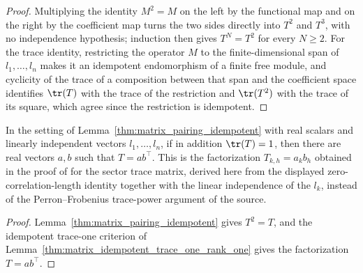 \begin{proof}
    \leanok
    Multiplying the identity $M^2=M$ on the left by the functional map and
    on the right by the coefficient map turns the two sides directly into
    $T^2$ and $T^3$, with no independence hypothesis; induction then gives
    $T^N=T^2$ for every $N\geq2$. For the trace identity, restricting the
    operator $M$ to the finite-dimensional span of $l_1,\ldots,l_n$ makes it
    an idempotent endomorphism of a finite free module, and cyclicity of
    the trace of a composition between that span and the coefficient space
    identifies $\tr(T)$ with the trace of the restriction and
    $\tr(T^2)$ with the trace of its square, which agree since
    the restriction is idempotent.
\end{proof}

\begin{lemma}
    \label{thm:matrix_pairing_rank_one}
    \leanok
    In the setting of Lemma~\ref{thm:matrix_pairing_idempotent} with real
    scalars and linearly independent vectors $l_1,\ldots,l_n$, if in addition
    $\tr(T)=1$, then there are real vectors $a,b$ such that $T=ab^\top$.
    This is the factorization $T_{k,h}=a_kb_h$ obtained in the proof of
    \cite[Appendix~C.2, Lemma~C.5]{Cirac2016MPDO_arXiv} for the sector trace
    matrix, derived here from the displayed zero-correlation-length identity
    together with the linear independence of the $l_k$, instead of the
    Perron--Frobenius trace-power argument of the source.
\end{lemma}

\begin{proof}
    \leanok
    Lemma~\ref{thm:matrix_pairing_idempotent} gives $T^2=T$, and the
    idempotent trace-one criterion of
    Lemma~\ref{thm:matrix_idempotent_trace_one_rank_one} gives the
    factorization $T=ab^\top$.
\end{proof}

